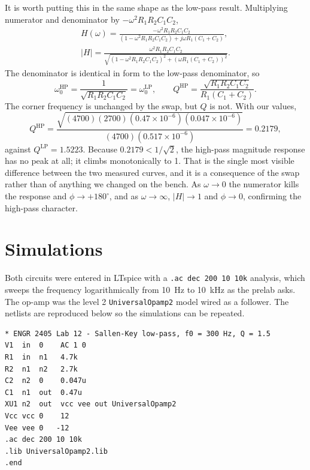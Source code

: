 \documentclass[11pt]{article}
\begin{document}
It is worth putting this in the same shape as the low-pass result. Multiplying
numerator and denominator by $-\omega^{2}R_1R_2C_1C_2$,
\begin{gather*}
    H(\omega) = \frac{-\omega^{2}R_1R_2C_1C_2}
    {\left(1-\omega^{2}R_1R_2C_1C_2\right) + j\omega R_1(C_1+C_2)},
    \\[4pt]
    |H| = \frac{\omega^{2}R_1R_2C_1C_2}
    {\sqrt{\left(1-\omega^{2}R_1R_2C_1C_2\right)^{2}
    + \left(\omega R_1(C_1+C_2)\right)^{2}}} .
\end{gather*}
The denominator is identical in form to the low-pass denominator, so
\[
    \omega_0^{\text{HP}} = \frac{1}{\sqrt{R_1R_2C_1C_2}} = \omega_0^{\text{LP}},
    \qquad
    Q^{\text{HP}} = \frac{\sqrt{R_1R_2C_1C_2}}{R_1(C_1+C_2)} .
\]
The corner frequency is unchanged by the swap, but $Q$ is not. With our values,
\[
    Q^{\text{HP}} = \frac{\sqrt{(4700)(2700)(0.47\times10^{-6})(0.047\times10^{-6})}}
    {(4700)(0.517\times10^{-6})} = 0.2179,
\]
against $Q^{\text{LP}} = 1.5223$. Because $0.2179 < 1/\sqrt{2}$, the high-pass
magnitude response has no peak at all; it climbs monotonically to 1. That is the
single most visible difference between the two measured curves, and it is a
consequence of the swap rather than of anything we changed on the bench. As
$\omega\to 0$ the numerator kills the response and $\phi \to +180^{\circ}$, and
as $\omega\to\infty$, $|H|\to 1$ and $\phi\to 0$, confirming the high-pass
character.

\section*{Simulations}
Both circuits were entered in LTspice with a \texttt{.ac dec 200 10 10k}
analysis, which sweeps the frequency logarithmically from \qty{10}{\hertz} to
\qty{10}{\kilo\hertz} as the prelab asks. The op-amp was the level 2
\texttt{UniversalOpamp2} model wired as a follower. The netlists are reproduced
below so the simulations can be repeated.

\begin{lstlisting}[style=spice, caption={LTspice netlist for the low-pass Sallen-Key circuit.}]
* ENGR 2405 Lab 12 - Sallen-Key low-pass, f0 = 300 Hz, Q = 1.5
V1  in  0    AC 1 0
R1  in  n1   4.7k
R2  n1  n2   2.7k
C2  n2  0    0.047u
C1  n1  out  0.47u
XU1 n2  out  vcc vee out UniversalOpamp2
Vcc vcc 0    12
Vee vee 0   -12
.ac dec 200 10 10k
.lib UniversalOpamp2.lib
.end
\end{lstlisting}
\end{document}
